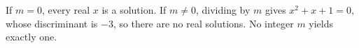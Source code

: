 If $m=0$, every real $x$ is a solution. If $m\ne0$, dividing by $m$ gives $x^2+x+1=0$, whose discriminant is $-3$, so there are no real solutions. No integer $m$ yields exactly one.
